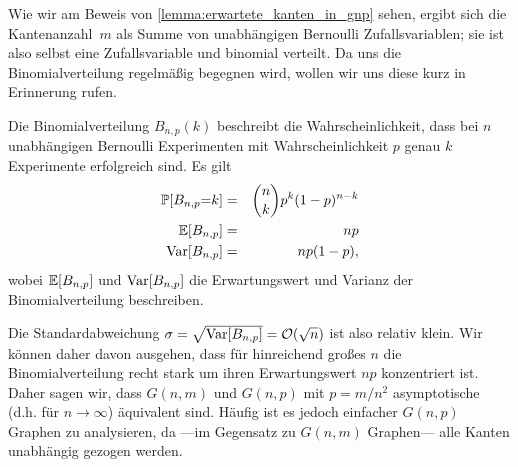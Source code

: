 Wie wir am Beweis von \cref{lemma:erwartete_kanten_in_gnp} sehen, ergibt sich die Kantenanzahl~$m$ als Summe von unabhängigen Bernoulli Zufallsvariablen;
sie ist also selbst eine Zufallsvariable und binomial verteilt.
Da uns die Binomialverteilung regelmäßig begegnen wird, wollen wir uns diese kurz in Erinnerung rufen.
\begin{definition}
    Die  Binomialverteilung $B_{n, p}(k)$ beschreibt die Wahrscheinlichkeit, dass bei $n$ unabhängigen Bernoulli Experimenten mit Wahrscheinlichkeit $p$ genau $k$ Experimente erfolgreich sind.
    Es gilt 
    \begin{eqnarray*}
        \mathbb{P}\!\left[B_{n,p} {=} k\right] &=& \binom{n}{k} p^k (1-p)^{n-k} \\
        \mathbb{E}\!\left[B_{n,p}\right] &=& np \\
        \operatorname{Var}\!\left[B_{n,p}\right] &=& np(1-p),
    \end{eqnarray*}
    wobei $\mathbb{E}\!\left[B_{n,p}\right]$ und $\operatorname{Var}\!\left[B_{n,p}\right]$ die Erwartungswert und Varianz der Binomialverteilung beschreiben.
\end{definition}

Die Standardabweichung $\sigma = \sqrt{\operatorname{Var}\!\left[B_{n,p}\right]} = \mathcal{O}\!\left(\sqrt n\right)$ ist also relativ klein.
Wir können daher davon ausgehen, dass für hinreichend großes $n$ die Binomialverteilung recht stark um ihren Erwartungswert $np$ konzentriert ist.
Daher sagen wir, dass $G(n, m)$ und $G(n, p)$ mit $p=m/n^2$ asymptotische (d.h. für $n \to \infty$) äquivalent sind.
Häufig ist es jedoch einfacher $G(n,p)$ Graphen zu analysieren, da ---im Gegensatz zu $G(n,m)$ Graphen--- alle Kanten unabhängig gezogen werden.

